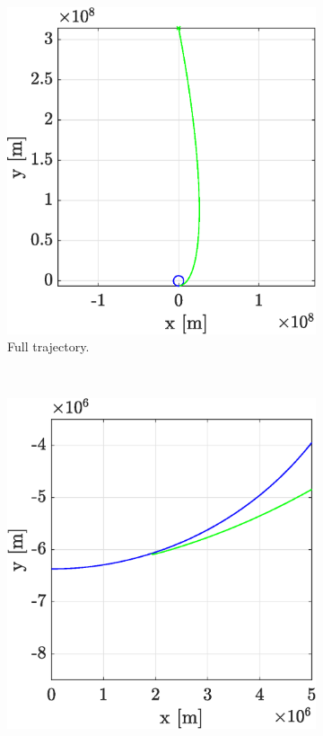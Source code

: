 \documentclass[a4paper,12pt,twoside]{article}
\begin{document}
\begin{figure}[h]
  \centering
  \begin{subfigure}[t]{0.45\textwidth}
    \includegraphics[width=\textwidth]{graphs/ex2a_traj_full.eps}
    \caption{Full trajectory.}
    \label{fig:2a_traj_full}
  \end{subfigure}
  ~
  \begin{subfigure}[t]{0.45\textwidth}
    \includegraphics[width=\textwidth]{graphs/ex2a_traj_close.eps}

\end{subfigure}
\end{figure}
\end{document}

